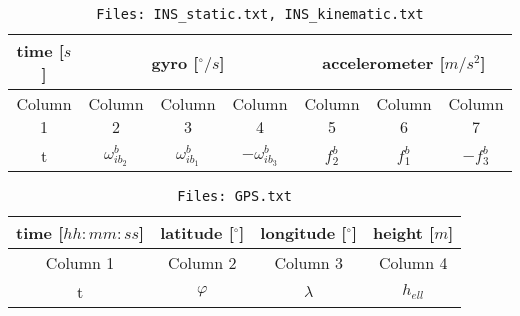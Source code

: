 \begin{table}[htbp]
	\centering
	\caption{{\tt Files: INS\_static.txt, INS\_kinematic.txt}}
		\begin{tabular}{ ccccccc }
		\addlinespace[10pt]
		time [$s$]	& \multicolumn{3}{c}{gyro [$^\circ /s$]} & \multicolumn{3}{c}{accelerometer [$m/s^2$]}\\ \toprule
		 Column 1 	&  Column 2 & Column 3 & Column 4 &  Column 5 & Column 6 & Column 7\\ \midrule
		t 	& $\omega_{ib_2}^b$ & $\omega_{ib_1}^b$	& $-\omega_{ib_3}^b$ 	& $f_2^b$ & $f_1^b$ & $-f_3^b$\\ \bottomrule
		\end{tabular}
\end{table}

\begin{table}[htbp]
	\centering
	\caption{{\tt Files: GPS.txt}}
		\begin{tabular}{ cccc }
		\addlinespace[10pt]
		time [$hh:mm:ss$]	& latitude [$^\circ$] & longitude [$^\circ$] & height [$m$]\\ \toprule
		 Column 1 	&  Column 2 & Column 3 & Column 4 \\ \midrule
		t 	& $\varphi$ & $\lambda$	& $h_{ell}$\\ \bottomrule
		\end{tabular}
\end{table}
